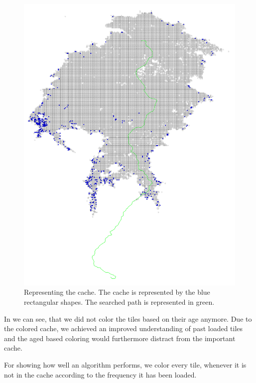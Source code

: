 \documentclass
[
    paper = a4,
    pagesize,
    12 pt,
    oneside,                       %
    open = right,
    DIV = calc,
    BCOR = 0 mm,                   %
    bibtotoc
]
{scrbook}
\begin{document}
\begin{figure}
    \includegraphics[width=\textwidth]{Images/vis-basic-cache.png}
\caption[]{Representing the cache. The cache is represented by the blue rectangular shapes. The searched path is represented in green.}
\label{fig:cache_coloring}
\end{figure}

In  we can see, that we did not color the tiles based on their age anymore.
Due to the colored cache, we achieved an improved understanding of past loaded tiles and the aged based coloring would furthermore distract from the important cache.

For showing how well an algorithm performs, we color every tile, whenever it is not in the cache according to the frequency it has been loaded.
\end{document}
